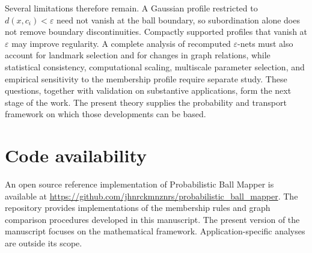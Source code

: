 \documentclass[9pt,a4paper,twocolumn,twoside]{extarticle}
\newcommand{\printbibliography}{%
}
\theoremstyle{definition}
\begin{document}
Several limitations therefore remain.  A Gaussian profile restricted to $d(x,c_i)<\varepsilon$ need not vanish at the ball boundary, so subordination alone does not remove boundary discontinuities. Compactly supported profiles that vanish at $\varepsilon$ may improve regularity. A complete analysis of recomputed $\varepsilon$-nets must also account for landmark selection and for changes in graph relations, while statistical consistency, computational scaling, multiscale parameter selection, and empirical sensitivity to the membership profile require separate study. These questions, together with validation on substantive applications, form the next stage of the work. The present theory supplies the probability and transport framework on which those developments can be based.

\section*{Code availability}

An open source reference implementation of Probabilistic Ball Mapper is available at \url{https://github.com/jhnrckmnznrs/probabilistic_ball_mapper}. The repository provides implementations of the membership rules and graph comparison procedures developed in this manuscript. The present version of the manuscript focuses on the mathematical framework. Application-specific analyses are outside its scope.

\printbibliography
\end{document}
